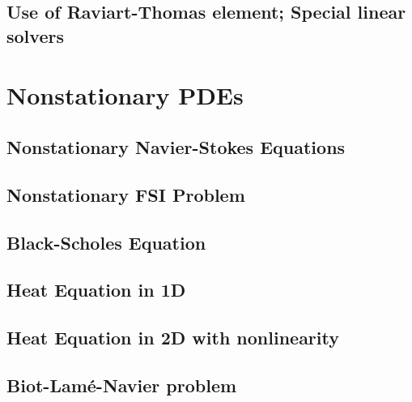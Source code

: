 \documentclass[a4paper,cleardoubleempty]{scrreprt}
\theoremstyle{plain}
\theoremstyle{remark}
\begin{document}
\subsection{Use of Raviart-Thomas element; Special linear solvers}
\label{PDE_RT}

\clearpage
\section{Nonstationary PDEs}
\label{PDE_Instat}

\subsection{Nonstationary Navier-Stokes Equations}
\label{PDE_Instat_Stokes}

\clearpage
\subsection{Nonstationary FSI Problem}
\label{PDE_Instat_FSI}

\clearpage
\subsection{Black-Scholes Equation}
\label{PDE_Instat_Black_Scholes}

\clearpage
\subsection{Heat Equation in 1D}
\label{PDE_Instat_Heat_1D}

\clearpage
\subsection{Heat Equation in 2D with nonlinearity}
\label{PDE_Instat_Heat_2D}

\clearpage
\subsection{Biot-Lam\'e-Navier problem}
\label{PDE_Instat_biot_lame_navier}

\cleardoublepage
\end{document}
